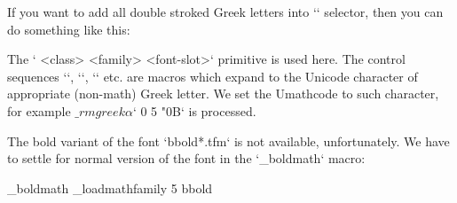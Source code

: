 If you want to add all double stroked Greek letters into `\bball`
selector, then you can do something like this:

\begtt \typosize[10/12]
\def\setbbgreekA #1{\Umathcode \_ea`#1 0 5 \tmpnum \advance\tmpnum by1 }

\addto{}
\endtt
%
The ` <class> <family> <font-slot>` primitive is used
here. The control sequences `\alpha`, `\beta`, `\gamma` etc. are macros which expand
to the Unicode character of appropriate (non-math) Greek letter. We set the
Umathcode to such character, for example
$\_rmgreek\alpha$` 0 5 "0B` is processed.

The bold variant of the font `bbold*.tfm` is not available, unfortunately.
We have to settle for normal version of the font in the `\_boldmath` macro:

\begtt \typosize[10/12]
   \addto \_boldmath {\_loadmathfamily 5 bbold }
\endtt


\bye
